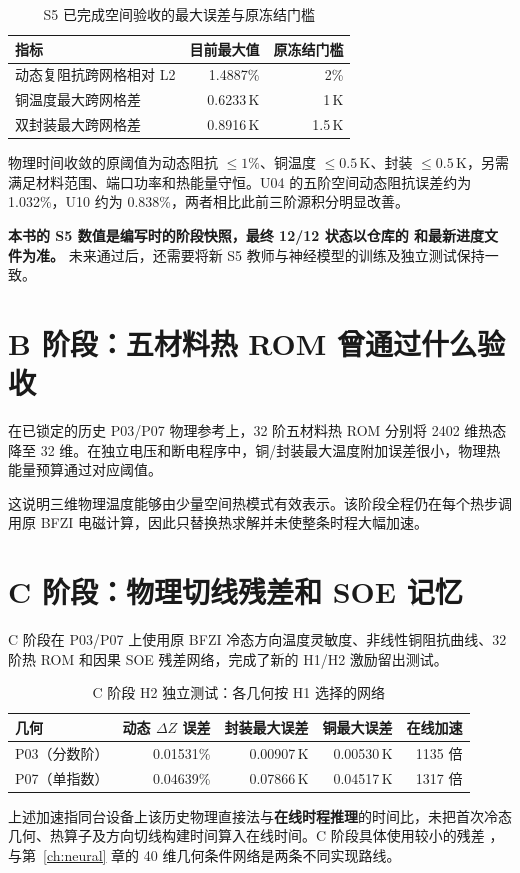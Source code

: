 \begin{table}[htbp]\centering\small
\caption{S5 已完成空间验收的最大误差与原冻结门槛}
\begin{tabularx}{\textwidth}{Xrr}
\toprule
指标 & 目前最大值 & 原冻结门槛\\
\midrule
动态复阻抗跨网格相对 L2 & 1.4887\% & 2\%\\
铜温度最大跨网格差 & 0.6233\,K & 1\,K\\
双封装最大跨网格差 & 0.8916\,K & 1.5\,K\\
\bottomrule
\end{tabularx}
\end{table}

物理时间收敛的原阈值为动态阻抗 $\le1\%$、铜温度 $\le0.5$\,K、封装 $\le0.5$\,K，另需满足材料范围、端口功率和热能量守恒。U04 的五阶空间动态阻抗误差约为 1.032\%，U10 约为 0.838\%，两者相比此前三阶源积分明显改善。

\textbf{本书的 S5 数值是编写时的阶段快照，最终 12/12 状态以仓库的  和最新进度文件为准。} 未来通过后，还需要将新 S5 教师与神经模型的训练及独立测试保持一致。

\section{B 阶段：五材料热 ROM 曾通过什么验收}
在已锁定的历史 P03/P07 物理参考上，32 阶五材料热 ROM 分别将 2402 维热态降至 32 维。在独立电压和断电程序中，铜/封装最大温度附加误差很小，物理热能量预算通过对应阈值。

这说明三维物理温度能够由少量空间热模式有效表示。该阶段全程仍在每个热步调用原 BFZI 电磁计算，因此只替换热求解并未使整条时程大幅加速。

\section{C 阶段：物理切线残差和 SOE 记忆}
C 阶段在 P03/P07 上使用原 BFZI 冷态方向温度灵敏度、非线性铜阻抗曲线、32 阶热 ROM 和因果 SOE 残差网络，完成了新的 H1/H2 激励留出测试。

\begin{table}[htbp]\centering\small
\caption{C 阶段 H2 独立测试：各几何按 H1 选择的网络}
\begin{tabularx}{\textwidth}{lrrrr}
\toprule
几何 & 动态 $\Delta Z$ 误差 & 封装最大误差 & 铜最大误差 & 在线加速\\
\midrule
P03（分数阶） & 0.01531\% & 0.00907\,K & 0.00530\,K & 1135 倍\\
P07（单指数） & 0.04639\% & 0.07866\,K & 0.04517\,K & 1317 倍\\
\bottomrule
\end{tabularx}
\end{table}
上述加速指同台设备上该历史物理直接法与\textbf{在线时程推理}的时间比，未把首次冷态几何、热算子及方向切线构建时间算入在线时间。C 阶段具体使用较小的残差 ，与第~\ref{ch:neural} 章的 40 维几何条件网络是两条不同实现路线。

